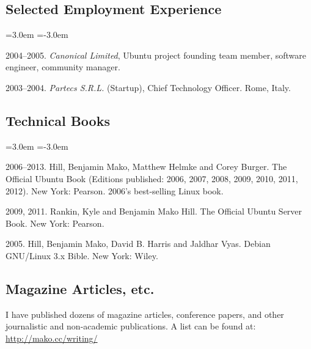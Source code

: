 \documentclass[10pt]{article}
\newenvironment{cvlist}{
\begin{list}{}{\leftmargin=3.0em \itemindent=-3.0em}
  \setlength{\itemsep}{0pt}
  \setlength{\parskip}{0em}
  \setlength{\parsep}{1em}
  \setlength{\parindent}{0em}}
{\vspace{1em}
\end{list}}
\begin{document}
\subsection{Selected Employment Experience}
\begin{cvlist}
\item 2004--2005. \emph{Canonical Limited}, Ubuntu project founding team member, software engineer, community manager.
\item 2003--2004. \emph{Partecs S.R.L.} (Startup), Chief Technology Officer. Rome, Italy.
\end{cvlist}

\subsection{Technical Books}
\begin{cvlist}
\item 2006--2013. Hill, Benjamin Mako, Matthew Helmke and Corey Burger. The Official Ubuntu Book (Editions published: 2006, 2007, 2008, 2009, 2010, 2011, 2012). New York: Pearson. 2006's best-selling Linux book.
\item 2009, 2011. Rankin, Kyle and Benjamin Mako Hill. The Official Ubuntu Server Book. New York: Pearson.
\item 2005. Hill, Benjamin Mako, David B. Harris and Jaldhar Vyas. Debian GNU/Linux 3.x Bible. New York: Wiley.
\end{cvlist}

\subsection{Magazine Articles, etc.}

I have published dozens of magazine articles, conference papers, and other journalistic and non-academic publications. A list can be found at: \url{http://mako.cc/writing/}
\end{document}
